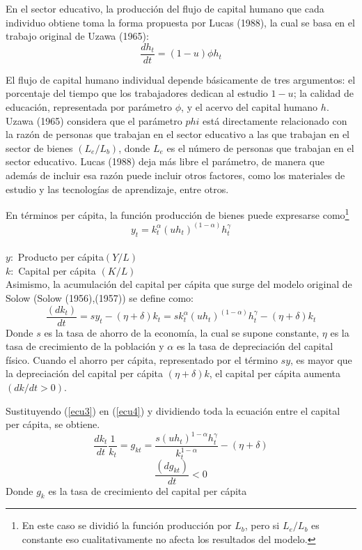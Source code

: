 \documentclass[12pt,notitlepage]{report}
\begin{document}
	En el sector educativo, la producción del flujo de capital humano que cada individuo obtiene toma la forma propuesta por Lucas (1988), la cual se basa en el trabajo original de Uzawa (1965): 
	\begin{equation}\label{ecu2}
		\frac{dh_t}{dt}=(1-u)\phi h_t   
	\end{equation}
	
	El flujo de capital humano individual depende básicamente de tres argumentos: el porcentaje del tiempo que los trabajadores dedican al estudio $1-u$; la calidad de educación, representada por parámetro $\phi$, y el acervo del capital humano $h$. Uzawa (1965) considera que el parámetro $phi$ está directamente relacionado con la razón de personas que trabajan en el sector educativo a las que trabajan en el sector de bienes $(L_e/L_b)$, donde $L_e$ es el número de personas que trabajan en el sector educativo. Lucas (1988) deja más libre el parámetro, de manera que además de incluir esa razón puede incluir otros factores, como los materiales de estudio y las tecnologías de aprendizaje, entre otros.
	
	\addtocounter{footnote}{10}
	
	En términos per cápita, la función producción de bienes puede expresarse como\footnote{En este caso se dividió la función producción por $L_b$, pero si $L_e/L_b$ es constante eso cualitativamente no afecta los resultados del modelo.}
	\begin{equation}\label{ecu3}
		y_t=k_t^\alpha(uh_t)^{(1-\alpha)}h_t^\gamma
	\end{equation}\\
	$y:$ Producto per cápita$(Y/L)$\\
	$k:$ Capital per cápita $(K/L)$\\
	Asimismo, la acumulación del capital per cápita que surge del modelo original de Solow (Solow (1956),(1957)) se define como:
	\begin{equation}\label{ecu4}
		\frac{(dk_t)}{dt}=sy_t-(\eta + \delta)k_t=sk_t^\alpha (uh_t)^{(1-\alpha)}h_t^\gamma - (\eta+\delta)k_t
	\end{equation}
	Donde $s$ es la tasa de ahorro de la economía, la cual se supone constante, $\eta$ es la tasa de crecimiento de la población y $\alpha$ es la tasa de depreciación del capital físico. Cuando el ahorro per cápita, representado por el término $sy$, es mayor que la depreciación del capital per cápita $(\eta +\delta )k$, el capital per cápita aumenta $(dk/dt>0)$.
	
	Sustituyendo (\ref{ecu3}) en (\ref{ecu4}) y dividiendo toda la ecuación entre el capital per cápita, se obtiene.
	\begin{equation}\label{ecu5}
		\frac{dk_t}{dt}\frac{1}{k_t}=g_{kt}=\frac{s(uh_t)^{1-\alpha}h_t^\gamma}{k_t^{1-\alpha}}-(\eta + \delta)
	\end{equation}
	\begin{equation*}
		\frac{(dg_{kt})}{dt}<0
	\end{equation*}
	Donde $g_{k}$ es la tasa de crecimiento del capital per cápita
	
\end{document}

